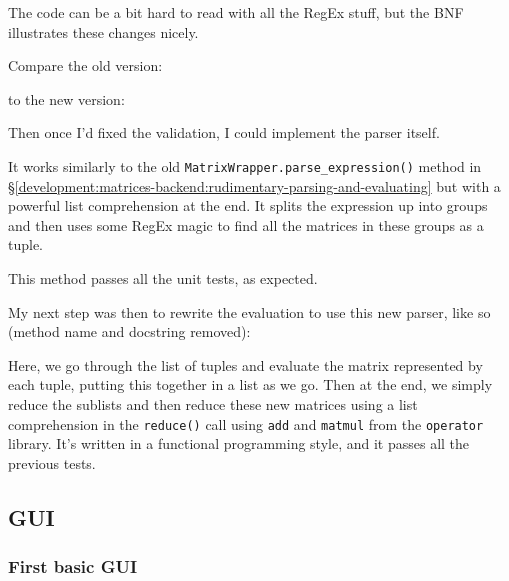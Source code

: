 \documentclass[../main.tex]{subfiles}
\begin{document}

The code can be a bit hard to read with all the RegEx stuff, but the BNF illustrates these changes nicely.

Compare the old version:


to the new version:


Then once I'd fixed the validation, I could implement the parser itself.


It works similarly to the old \texttt{MatrixWrapper.parse\_expression()} method in \S\ref{development:matrices-backend:rudimentary-parsing-and-evaluating} but with a powerful list comprehension at the end. It splits the expression up into groups and then uses some RegEx magic to find all the matrices in these groups as a tuple.

This method passes all the unit tests, as expected.

My next step was then to rewrite the evaluation to use this new parser, like so (method name and docstring removed):


Here, we go through the list of tuples and evaluate the matrix represented by each tuple, putting this together in a list as we go. Then at the end, we simply reduce the sublists and then reduce these new matrices using a list comprehension in the \texttt{reduce()} call using \texttt{add} and \texttt{matmul} from the \texttt{operator} library. It's written in a functional programming style, and it passes all the previous tests.

\subsection{GUI\label{development:gui}}

\subsubsection{First basic GUI\label{development:gui:first-basic-gui}}
\end{document}
